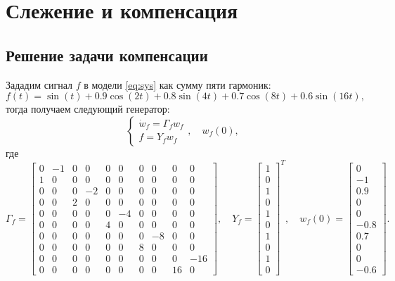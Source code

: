 \chapter{Слежение и компенсация}

\section{Решение задачи компенсации}

Зададим сигнал $f$ в модели \eqref{eq:sys} как сумму пяти гармоник:
\begin{equation*}
    f(t)=\sin(t)+0.9\cos(2t)+0.8\sin(4t)+0.7\cos(8t)+0.6\sin(16t),
\end{equation*} 
тогда получаем следующий генератор:
\begin{equation}
    \label{eq:5.1.gen}
    \begin{cases}
        \dot w_f=\Gamma_f w_f\\
        f = Y_fw_f
    \end{cases},\quad w_f(0),
\end{equation}
где
\begin{equation*}
    \Gamma_f=\begin{bmatrix}
0 & -1 & 0 & 0 & 0 & 0 & 0 & 0 & 0 & 0\\
1 & 0 & 0 & 0 & 0 & 0 & 0 & 0 & 0 & 0\\
0 & 0 & 0 & -2 & 0 & 0 & 0 & 0 & 0 & 0\\
0 & 0 & 2 & 0 & 0 & 0 & 0 & 0 & 0 & 0\\
0 & 0 & 0 & 0 & 0 & -4 & 0 & 0 & 0 & 0\\
0 & 0 & 0 & 0 & 4 & 0 & 0 & 0 & 0 & 0\\
0 & 0 & 0 & 0 & 0 & 0 & 0 & -8 & 0 & 0\\
0 & 0 & 0 & 0 & 0 & 0 & 8 & 0 & 0 & 0\\
0 & 0 & 0 & 0 & 0 & 0 & 0 & 0 & 0 & -16\\
0 & 0 & 0 & 0 & 0 & 0 & 0 & 0 & 16 & 0
     \end{bmatrix},\quad
        Y_f=\begin{bmatrix}
    1 \\ 0 \\ 1 \\ 0 \\ 1 \\ 0 \\ 1 \\ 0 \\ 1 \\ 0
        \end{bmatrix}^T,\quad
        w_f(0)=\begin{bmatrix}
0\\
-1\\
0.9\\
0\\
0\\
-0.8\\
0.7\\
0\\
0\\
-0.6
        \end{bmatrix}.
\end{equation*}
